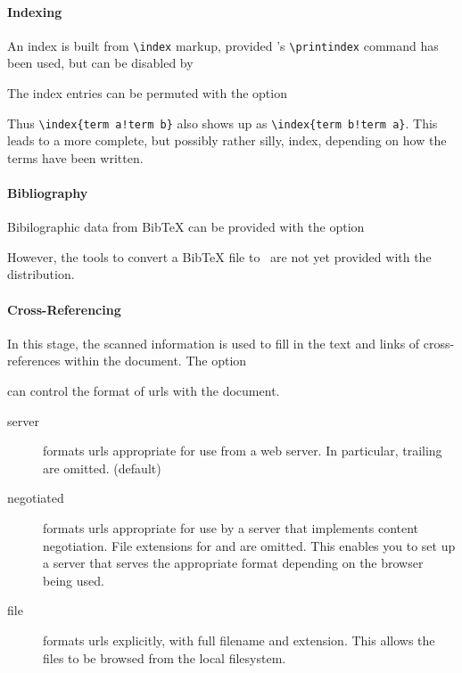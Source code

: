 \documentclass{report}
\begin{document}
\paragraph{Indexing}
An index is built from \verb|\index| markup, provided 
's \verb|\printindex| command has been used,
but can be disabled by
\begin{quote}
\end{quote}
The index entries can be permuted with the option
\begin{quote}
\end{quote}
Thus \verb|\index{term a!term b}| also shows up as \verb|\index{term b!term a}|.
This leads to a more complete, but possibly rather silly, index,
depending on how the terms have been written.

\paragraph{Bibliography}
Bibilographic data from BibTeX can be provided with the option
\begin{quote}
\end{quote}
However, the tools to convert a BibTeX file to \XML\ are
not yet provided with the distribution.

\paragraph{Cross-Referencing}
In this stage, the scanned information is used to fill in the
text and links of cross-references within the document.
The option
\begin{quote}
\end{quote}
can control the format of urls with the document.
\begin{description}
  \item[server] formats urls appropriate for use from a web server.
    In particular, trailing  are omitted. (default)
  \item[negotiated] formats urls appropriate for use by a server
    that implements content negotiation. File extensions for 
    and  are omitted.  This enables you to set up a server
    that serves the appropriate format depending on the browser being used.
  \item[file] formats urls explicitly, with full filename and extension.
    This allows the files to be browsed from the local filesystem.
\end{description}
\end{document}
